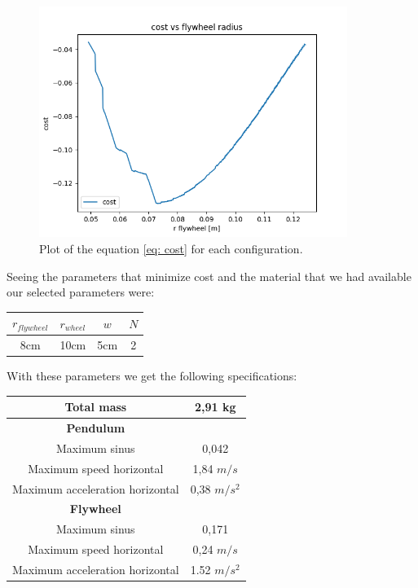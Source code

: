 \begin{figure}[H]
	\centering
	\includegraphics[width=10cm]{img/optimization/cost.png}
	\caption{Plot of the equation \ref{eq: cost} for each configuration.}
	\label{fig:Cost plot}
\end{figure}

Seeing the parameters that minimize cost and the material that we had available
our selected parameters were:
\begin{center}
	\begin{tabular}{ |c|c|c|c| } 
	 \hline
	 $r_{flywheel}$ & $r_{wheel}$ & $w$ & $N$\\
	 \hline 
	 8cm & 10cm & 5cm & 2 \\ 
	 \hline
	\end{tabular}
\end{center}

With these parameters we get the following specifications:
\begin{center}
	\begin{tabular}{ |c|c| } 
	 \hline
	 Total mass & 2,91 kg\\
	 \hline
	 \textbf{Pendulum} \\
	 \hline
	 Maximum sinus & 0,042\\
	 \hline
	 Maximum speed horizontal & 1,84 $m/s$\\
	 \hline
	 Maximum acceleration horizontal & 0,38 $m/s^2$\\
	 \hline
	 \textbf{Flywheel} \\
	 \hline
	 Maximum sinus & 0,171\\
	 \hline
	 Maximum speed horizontal & 0,24 $m/s$\\
	 \hline
	 Maximum acceleration horizontal & 1.52 $m/s^2$\\
	 \hline
	\end{tabular}
\end{center}